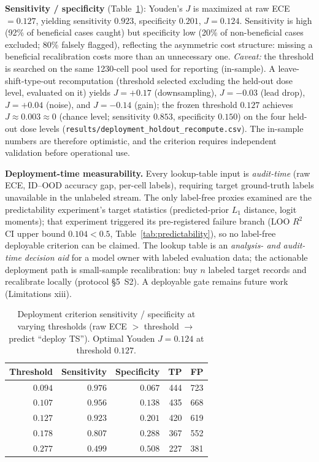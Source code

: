 \documentclass[review,12pt,nonatbib]{elsarticle}
\begin{document}
\textbf{Sensitivity / specificity} (Table~\ref{tab:deploy_sens}):
Youden's $J$ is maximized at raw ECE $=0.127$, yielding sensitivity
$0.923$, specificity $0.201$, $J=0.124$. Sensitivity is high (92\% of
beneficial cases caught) but specificity low (20\% of non-beneficial
cases excluded; 80\% falsely flagged), reflecting the asymmetric cost
structure: missing a beneficial recalibration costs more than an
unnecessary one.
\emph{Caveat:} the threshold is searched on the same 1230-cell pool used
for reporting (in-sample). A leave-shift-type-out recomputation (threshold
selected excluding the held-out dose level, evaluated on it) yields
$J=+0.17$ (downsampling), $J=-0.03$ (lead drop), $J=+0.04$
(noise), and $J=-0.14$ (gain); the frozen threshold $0.127$ achieves
$J\approx 0.003\approx 0$ (chance level; sensitivity $0.853$,
specificity $0.150$) on the four held-out dose levels
(\texttt{results/deployment\_holdout\_recompute.csv}). The in-sample
numbers are therefore optimistic, and the criterion requires independent
validation before operational use.

\textbf{Deployment-time measurability.} Every lookup-table input is
\emph{audit-time} (raw ECE, ID--OOD accuracy gap, per-cell labels),
requiring target ground-truth labels unavailable in the unlabeled stream. The only label-free proxies examined are the predictability
experiment's target statistics (predicted-prior $L_1$ distance, logit
moments); that experiment triggered its pre-registered failure branch
(LOO $R^2$ CI upper bound $0.104 < 0.5$, Table~\ref{tab:predictability}),
so no label-free deployable criterion can be claimed. The lookup table is
an \emph{analysis- and audit-time decision aid} for a model owner with
labeled evaluation data; the actionable deployment path is small-sample
recalibration: buy $n$ labeled target records and recalibrate locally
(protocol \S5~S2). A deployable gate remains future work
(Limitations xiii).

\begin{table}[t]
\centering
\caption{Deployment criterion sensitivity / specificity at varying
thresholds (raw ECE $>$ threshold $\rightarrow$ predict ``deploy TS'').
Optimal Youden $J=0.124$ at threshold $0.127$.}
\label{tab:deploy_sens}
\begin{tabular}{rrrrr}
\toprule
Threshold & Sensitivity & Specificity & TP & FP \\
\midrule
$0.094$ & $0.976$ & $0.067$ & 444 & 723 \\
$0.107$ & $0.956$ & $0.138$ & 435 & 668 \\
$0.127$ & $0.923$ & $0.201$ & 420 & 619 \\
$0.178$ & $0.807$ & $0.288$ & 367 & 552 \\
$0.277$ & $0.499$ & $0.508$ & 227 & 381 \\
\bottomrule
\end{tabular}
\end{table}
\end{document}
